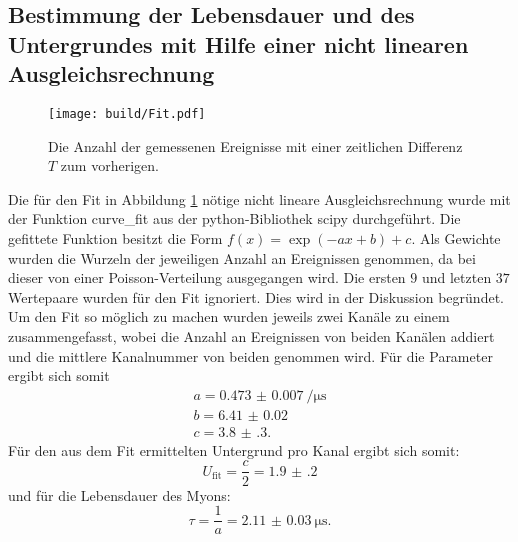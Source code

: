 \subsection{Bestimmung der Lebensdauer und des Untergrundes mit Hilfe einer nicht linearen Ausgleichsrechnung}
\label{subsec:Ausgleichs}
\begin{figure}
	\centering
	\texttt{[image: build/Fit.pdf]}
	\caption{Die Anzahl der gemessenen Ereignisse mit einer zeitlichen Differenz $T$ zum vorherigen.}
	\label{fig:zweite}
\end{figure}
Die für den Fit in Abbildung \ref{fig:zweite} nötige nicht lineare Ausgleichsrechnung wurde mit der Funktion curve\_fit aus der python-Bibliothek scipy \cite{scipy} durchgeführt. Die gefittete Funktion besitzt die Form $f(x)=\exp(-a x +b)+c$. Als Gewichte wurden die Wurzeln der jeweiligen Anzahl an Ereignissen genommen, da bei dieser von einer Poisson-Verteilung ausgegangen wird. Die ersten $9$ und letzten $37$ Wertepaare wurden für den Fit ignoriert. Dies wird in der Diskussion begründet. Um den Fit so möglich zu machen wurden jeweils zwei Kanäle zu einem zusammengefasst, wobei die Anzahl an Ereignissen von beiden Kanälen addiert und die mittlere Kanalnummer von beiden genommen wird. %
Für die Parameter ergibt sich somit
\begin{gather*}
a=\SI{0.473(7)}{\per\micro\second}\\
b=\num{6.41(2)}\\
c=\num{3.8(3)}.
\end{gather*}
Für den aus dem Fit ermittelten Untergrund pro Kanal ergibt sich somit:
\begin{displaymath}
	U_\text{fit}=\frac{c}{2}=\num{1.9(2)}
\end{displaymath}
und für die Lebensdauer des Myons:
\begin{displaymath}
	\tau=\frac{1}{a}=\SI{2.11(3)}{\micro\second}.
\end{displaymath}